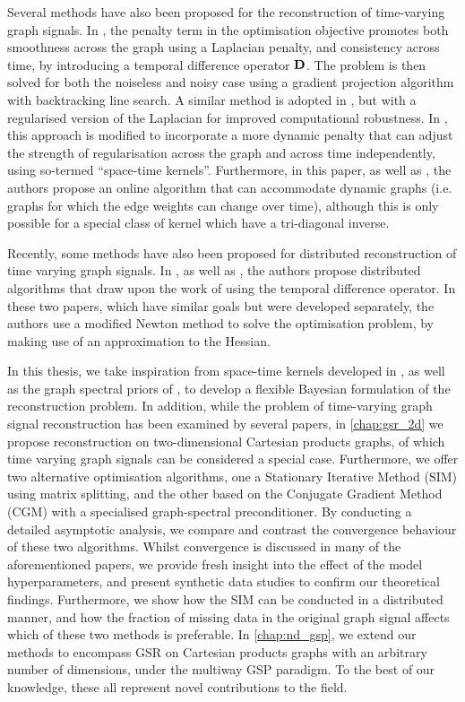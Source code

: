 Several methods have also been proposed for the reconstruction of time-varying graph signals. In \cite{Qiu2017}, the penalty term in the optimisation objective promotes both smoothness across the graph using a Laplacian penalty, and consistency across time, by introducing a temporal difference operator $\mathbf{D}$. The problem is then solved for both the noiseless and noisy case using a gradient projection algorithm with backtracking line search. A similar method is adopted in \cite{Giraldo2022}, but with a regularised version of the Laplacian for improved computational robustness. In \cite{Ioannidis2016}, this approach is modified to incorporate a more dynamic penalty that can adjust the strength of regularisation across the graph and across time independently, using so-termed ``space-time kernels''. Furthermore, in this paper, as well as \cite{Romero2017,Ioannidis2018}, the authors propose an online algorithm that can accommodate dynamic graphs (i.e. graphs for which the edge weights can change over time), although this is only possible for a special class of kernel which have a tri-diagonal inverse. 

Recently, some methods have also been proposed for distributed reconstruction of time varying graph signals. In \cite{Chi2022}, as well as \citep{Zhou2022b}, the authors propose distributed algorithms that draw upon the work of \cite{Qiu2017} using the temporal difference operator. In these two papers, which have similar goals but were developed separately, the authors use a modified Newton method to solve the optimisation problem, by making use of an approximation to the Hessian. 

In this thesis, we take inspiration from space-time kernels developed in \cite{Ioannidis2016}, as well as the graph spectral priors of \cite{Venkitaraman2020}, to develop a flexible Bayesian formulation of the reconstruction problem. In addition, while the problem of time-varying graph signal reconstruction has been examined by several papers, in \cref{chap:gsr_2d} we propose reconstruction on two-dimensional Cartesian products graphs, of which time varying graph signals can be considered a special case. Furthermore, we offer two alternative optimisation algorithms, one a Stationary Iterative Method (SIM) using matrix splitting, and the other based on the Conjugate Gradient Method (CGM) with a specialised graph-spectral preconditioner. By conducting a detailed asymptotic analysis, we compare and contrast the convergence behaviour of these two algorithms. Whilst convergence is discussed in many of the aforementioned papers, we provide fresh insight into the effect of the model hyperparameters, and present synthetic data studies to confirm our theoretical findings. Furthermore, we show how the SIM can be conducted in a distributed manner, and how the fraction of missing data in the original graph signal affects which of these two methods is preferable. In \cref{chap:nd_gsp}, we extend our methods to encompass GSR on Cartesian products graphs with an arbitrary number of dimensions, under the multiway GSP paradigm. To the best of our knowledge, these all represent novel contributions to the field. 


